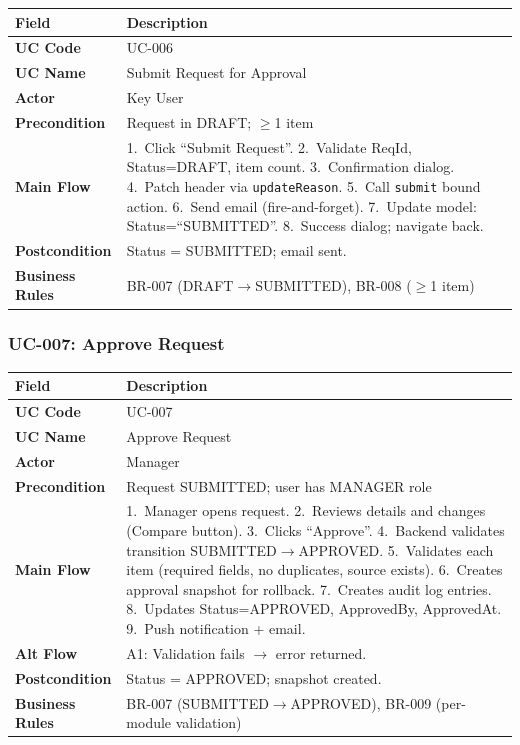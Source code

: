 \documentclass[12pt,a4paper]{report}
\begin{document}
\begin{longtable}{|>{\bfseries}p{2.8cm}|p{12cm}|}
  \hline
  \rowcolor{tableheadpeach}
  \textbf{Field} & \textbf{Description} \\ \hline
  \endhead \hline \endfoot
  UC Code       & UC-006 \\ \hline
  UC Name       & Submit Request for Approval \\ \hline
  Actor         & Key User \\ \hline
  Precondition  & Request in DRAFT; $\geq$1 item \\ \hline
  Main Flow     & 1.~Click ``Submit Request''.
                  2.~Validate ReqId, Status=DRAFT, item count.
                  3.~Confirmation dialog.
                  4.~Patch header via \texttt{updateReason}.
                  5.~Call \texttt{submit} bound action.
                  6.~Send email (fire-and-forget).
                  7.~Update model: Status=``SUBMITTED''.
                  8.~Success dialog; navigate back. \\ \hline
  Postcondition & Status = SUBMITTED; email sent. \\ \hline
  Business Rules& BR-007 (DRAFT$\rightarrow$SUBMITTED), BR-008 ($\geq$1 item) \\ \hline
\end{longtable}

\subsubsection{UC-007: Approve Request}

\begin{longtable}{|>{\bfseries}p{2.8cm}|p{12cm}|}
  \hline
  \rowcolor{tableheadpeach}
  \textbf{Field} & \textbf{Description} \\ \hline
  \endhead \hline \endfoot
  UC Code       & UC-007 \\ \hline
  UC Name       & Approve Request \\ \hline
  Actor         & Manager \\ \hline
  Precondition  & Request SUBMITTED; user has MANAGER role \\ \hline
  Main Flow     & 1.~Manager opens request.
                  2.~Reviews details and changes (Compare button).
                  3.~Clicks ``Approve''.
                  4.~Backend validates transition SUBMITTED$\rightarrow$APPROVED.
                  5.~Validates each item (required fields, no duplicates, source exists).
                  6.~Creates approval snapshot for rollback.
                  7.~Creates audit log entries.
                  8.~Updates Status=APPROVED, ApprovedBy, ApprovedAt.
                  9.~Push notification + email. \\ \hline
  Alt Flow      & A1: Validation fails $\rightarrow$ error returned. \\ \hline
  Postcondition & Status = APPROVED; snapshot created. \\ \hline
  Business Rules& BR-007 (SUBMITTED$\rightarrow$APPROVED), BR-009 (per-module validation) \\ \hline
\end{longtable}
\end{document}
